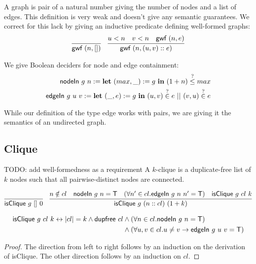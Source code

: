 \documentclass[a4paper,UKenglish,cleveref, autoref]{lipics-v2019}
\begin{document}
A graph is pair of a natural number giving the number of nodes and a list of edges. This definition is very weak and doesn't give any semantic guarantees. We correct for this lack by giving an inductive predicate defining well-formed graphs:
\begin{align*}
  \infer{\textsf{gwf}~(n,[])}{} && \infer{\textsf{gwf}~(n,(u, v) :: e)}{u < n \quad v < n \quad \textsf{gwf}~(n, e)}
\end{align*}

We give Boolean deciders for node and edge containment:
\begin{align*}
  \textsf{nodeIn}~g~n := \textbf{let}~ (max, \_) := g~\textbf{in}~ (1 + n) \overset{?}{\le} max\\
  \textsf{edgeIn}~g~u~v := \textbf{let}~ (\_, e) := g~\textbf{in}~ (u, v) \overset{?}{\in} e~||~(v, u) \overset{?}{\in} e
\end{align*}

While our definition of the type \textsf{edge} works with pairs, we are giving it the semantics of an undirected graph.

\subsection{Clique}
TODO: add well-formedness as a requirement
A $k$-clique is a duplicate-free list of $k$ nodes such that all pairwise-distinct nodes are connected.

\begin{align*}
  \infer{\textsf{isClique}~g~[]~0}{} && \infer{\textsf{isClique}~g~(n::cl)~(\natS k)}{n \notin cl \quad \textsf{nodeIn}~g~n = \btrue \quad (\forall n' \in cl. \textsf{edgeIn}~g~n~n' = \btrue) \quad \textsf{isClique}~g~cl~k}
\end{align*}

\begin{lemma}\label{prop:cliqueexpl}
  \begin{align*}
    \normalfont\textsf{isClique}~g~cl~k \leftrightarrow |cl| = k \land \normalfont\textsf{dupfree}~cl &\land (\forall n \in cl. \normalfont\textsf{nodeIn}~g~n = \mathsf{T}) \\
    &\land (\forall u,v \in cl. u \neq v \rightarrow \normalfont\textsf{edgeIn}~g~u~v = \mathsf{T})
  \end{align*}
\end{lemma}
\begin{proof}
  The direction from left to right follows by an induction on the derivation of \textsf{isClique}. The other direction follows by an induction on $cl$.
\end{proof}
\end{document}
